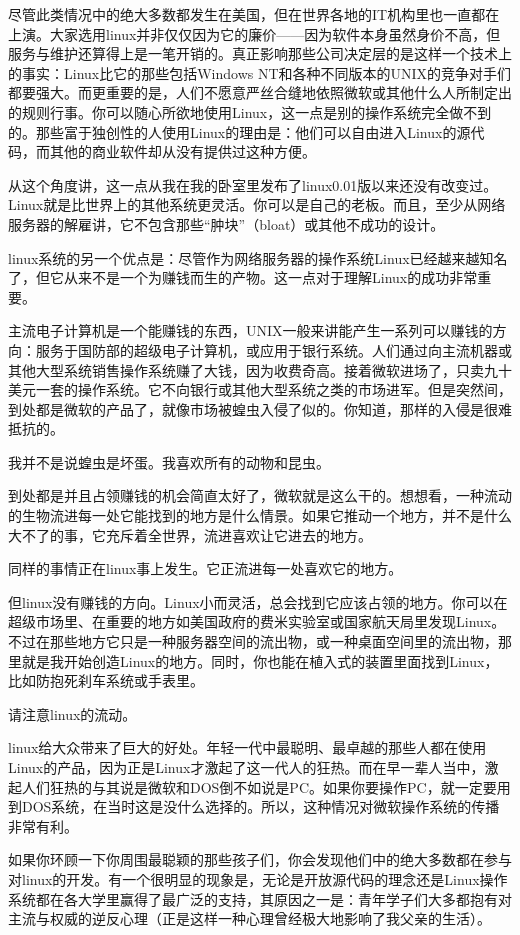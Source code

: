 尽管此类情况中的绝大多数都发生在美国，但在世界各地的IT机构里也一直都在上演。大家选用linux并非仅仅因为它的廉价——因为软件本身虽然身价不高，但服务与维护还算得上是一笔开销的。真正影响那些公司决定层的是这样一个技术上的事实：Linux比它的那些包括Windows NT和各种不同版本的UNIX的竞争对手们都要强大。而更重要的是，人们不愿意严丝合缝地依照微软或其他什么人所制定出的规则行事。你可以随心所欲地使用Linux，这一点是别的操作系统完全做不到的。那些富于独创性的人使用Linux的理由是：他们可以自由进入Linux的源代码，而其他的商业软件却从没有提供过这种方便。

从这个角度讲，这一点从我在我的卧室里发布了linux0.01版以来还没有改变过。Linux就是比世界上的其他系统更灵活。你可以是自己的老板。而且，至少从网络服务器的解雇讲，它不包含那些“肿块”（bloat）或其他不成功的设计。

linux系统的另一个优点是：尽管作为网络服务器的操作系统Linux已经越来越知名了，但它从来不是一个为赚钱而生的产物。这一点对于理解Linux的成功非常重要。

主流电子计算机是一个能赚钱的东西，UNIX一般来讲能产生一系列可以赚钱的方向：服务于国防部的超级电子计算机，或应用于银行系统。人们通过向主流机器或其他大型系统销售操作系统赚了大钱，因为收费奇高。接着微软进场了，只卖九十美元一套的操作系统。它不向银行或其他大型系统之类的市场进军。但是突然间，到处都是微软的产品了，就像市场被蝗虫入侵了似的。你知道，那样的入侵是很难抵抗的。

我并不是说蝗虫是坏蛋。我喜欢所有的动物和昆虫。

到处都是并且占领赚钱的机会简直太好了，微软就是这么干的。想想看，一种流动的生物流进每一处它能找到的地方是什么情景。如果它推动一个地方，并不是什么大不了的事，它充斥着全世界，流进喜欢让它进去的地方。

同样的事情正在linux事上发生。它正流进每一处喜欢它的地方。

但linux没有赚钱的方向。Linux小而灵活，总会找到它应该占领的地方。你可以在超级市场里、在重要的地方如美国政府的费米实验室或国家航天局里发现Linux。不过在那些地方它只是一种服务器空间的流出物，或一种桌面空间里的流出物，那里就是我开始创造Linux的地方。同时，你也能在植入式的装置里面找到Linux，比如防抱死刹车系统或手表里。

请注意linux的流动。

linux给大众带来了巨大的好处。年轻一代中最聪明、最卓越的那些人都在使用Linux的产品，因为正是Linux才激起了这一代人的狂热。而在早一辈人当中，激起人们狂热的与其说是微软和DOS倒不如说是PC。如果你要操作PC，就一定要用到DOS系统，在当时这是没什么选择的。所以，这种情况对微软操作系统的传播非常有利。

如果你环顾一下你周围最聪颖的那些孩子们，你会发现他们中的绝大多数都在参与对linux的开发。有一个很明显的现象是，无论是开放源代码的理念还是Linux操作系统都在各大学里赢得了最广泛的支持，其原因之一是：青年学子们大多都抱有对主流与权威的逆反心理（正是这样一种心理曾经极大地影响了我父亲的生活）。

